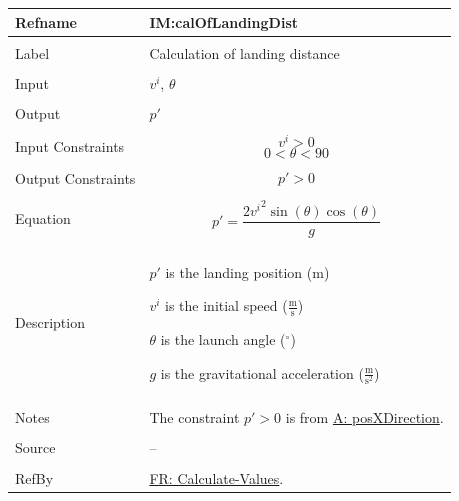 \documentclass[12pt]{article}
\begin{document}
\noindent \begin{minipage}{\textwidth}
\begin{tabular}{p{} p{}}
\toprule \textbf{Refname} & \textbf{IM:calOfLandingDist}
\label{IM:calOfLandingDist}
\\ \midrule \\
Label & Calculation of landing distance
\\ \midrule \\
Input & ${v^{i}}$, $θ$
\\ \midrule \\
Output & $p'$
\\ \midrule \\
Input Constraints & \begin{displaymath}
                    {v^{i}}>0
                    \end{displaymath}
                    \begin{displaymath}
                    0<θ<90
                    \end{displaymath}
\\ \midrule \\
Output Constraints & \begin{displaymath}
                     p'>0
                     \end{displaymath}
\\ \midrule \\
Equation & \begin{displaymath}
           p'=\frac{2 {v^{i}}^{2} \sin\left(θ\right) \cos\left(θ\right)}{g}
           \end{displaymath}
\\ \midrule \\
Description & \begin{symbDescription}
              \item{$p'$ is the landing position (m)}
              \item{${v^{i}}$ is the initial speed ($\frac{\text{m}}{\text{s}}$)}
              \item{$θ$ is the launch angle (${}^{\circ}$)}
              \item{$g$ is the gravitational acceleration ($\frac{\text{m}}{\text{s}^{2}}$)}
              \end{symbDescription}
\\ \midrule \\
Notes & The constraint $p'>0$ is from \hyperref[posXDirection]{A: posXDirection}.
\\ \midrule \\
Source & --
\\ \midrule \\
RefBy & \hyperref[calcValues]{FR: Calculate-Values}.
\\ \bottomrule \end{tabular}
\end{minipage}
\end{document}
